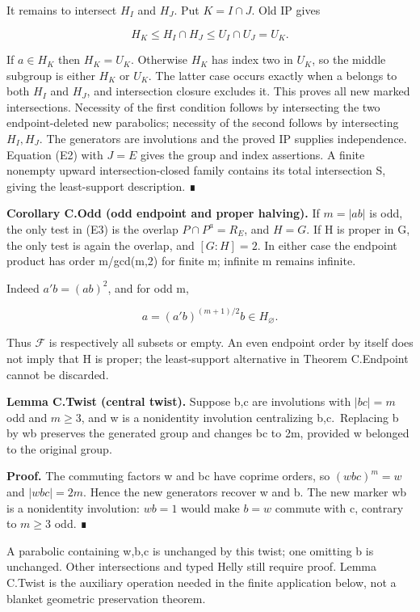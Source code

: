 \documentclass[
  11pt,
  a4paper,
]{article}
\newcounter{none} %
\begin{document}
It remains to intersect \(H_I\) and \(H_J\). Put \(K=I\cap J\). Old IP
gives

\[
H_K\le H_I\cap H_J\le U_I\cap U_J=U_K.
\tag{E5}
\]

If \(a\in H_K\) then \(H_K=U_K\). Otherwise \(H_K\) has index two in
\(U_K\), so the middle subgroup is either \(H_K\) or \(U_K\). The latter
case occurs exactly when a belongs to both \(H_I\) and \(H_J\), and
intersection closure excludes it. This proves all new marked
intersections. Necessity of the first condition follows by intersecting
the two endpoint-deleted new parabolics; necessity of the second follows
by intersecting \(H_I,H_J\). The generators are involutions and the
proved IP supplies independence. Equation (E2) with \(J=E\) gives the
group and index assertions. A finite nonempty upward intersection-closed
family contains its total intersection S, giving the least-support
description. ∎

\textbf{Corollary C.Odd (odd endpoint and proper halving).} If
\(m=|ab|\) is odd, the only test in (E3) is the overlap
\(P\cap P^a=R_E\), and \(H=G\). If H is proper in G, the only test is
again the overlap, and \([G:H]=2\). In either case the endpoint product
has order m/gcd(m,2) for finite m; infinite m remains infinite.

Indeed \(a'b=(ab)^{2}\), and for odd m,

\[
a=(a'b)^{(m+1)/2}b\in H_\varnothing.
\]

Thus \(\mathcal F\) is respectively all subsets or empty. An even
endpoint order by itself does not imply that H is proper; the
least-support alternative in Theorem C.Endpoint cannot be discarded.

\textbf{Lemma C.Twist (central twist).} Suppose b,c are involutions with
\(|bc|=m\) odd and \(m\ge 3\), and w is a nonidentity involution
centralizing b,c.~Replacing b by wb preserves the generated group and
changes \textbar bc\textbar{} to 2m, provided w belonged to the original
group.

\textbf{Proof.} The commuting factors w and bc have coprime orders, so
\((wbc)^m=w\) and \(|wbc|=2m\). Hence the new generators recover w and
b. The new marker wb is a nonidentity involution: \(wb=1\) would make
\(b=w\) commute with c, contrary to \(m\ge 3\) odd. ∎

A parabolic containing w,b,c is unchanged by this twist; one omitting b
is unchanged. Other intersections and typed Helly still require proof.
Lemma C.Twist is the auxiliary operation needed in the finite
application below, not a blanket geometric preservation theorem.
\end{document}
